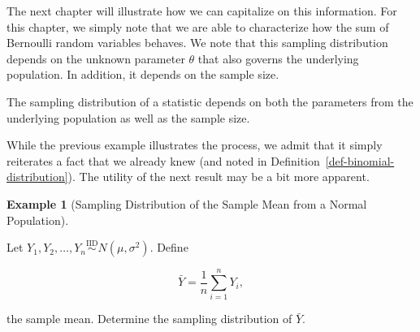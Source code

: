 \documentclass[
  letterpaper,
  DIV=11,
  numbers=noendperiod]{scrreprt}
\theoremstyle{plain}
\theoremstyle{definition}
\theoremstyle{definition}
\newtheorem{example}{Example}[chapter]
\theoremstyle{remark}
\begin{document}
The next chapter will illustrate how we can capitalize on this
information. For this chapter, we simply note that we are able to
characterize how the sum of Bernoulli random variables behaves. We note
that this sampling distribution depends on the unknown parameter
\(\theta\) that also governs the underlying population. In addition, it
depends on the sample size.

\begin{tcolorbox}[enhanced jigsaw, toprule=.15mm, left=2mm, title=\textcolor{quarto-callout-tip-color}{\faLightbulb}\hspace{0.5em}{Big Idea}, opacityback=0, toptitle=1mm, leftrule=.75mm, colbacktitle=quarto-callout-tip-color!10!white, opacitybacktitle=0.6, titlerule=0mm, breakable, colframe=quarto-callout-tip-color-frame, arc=.35mm, coltitle=black, bottomtitle=1mm, rightrule=.15mm, colback=white, bottomrule=.15mm]

The sampling distribution of a statistic depends on both the parameters
from the underlying population as well as the sample size.

\end{tcolorbox}

While the previous example illustrates the process, we admit that it
simply reiterates a fact that we already knew (and noted in
Definition~\ref{def-binomial-distribution}). The utility of the next
result may be a bit more apparent.

\begin{example}[Sampling Distribution of the Sample Mean from a Normal
Population]\protect\hypertarget{exm-normal-mean}{}\label{exm-normal-mean}

Let
\(Y_1, Y_2, \dotsc, Y_n \stackrel{\text{IID}}{\sim} N\left(\mu,\sigma^2\right)\).
Define

\[\bar{Y} = \frac{1}{n}\sum_{i=1}^{n} Y_i,\]

the sample mean. Determine the sampling distribution of \(\bar{Y}\).

\end{example}
\end{document}
